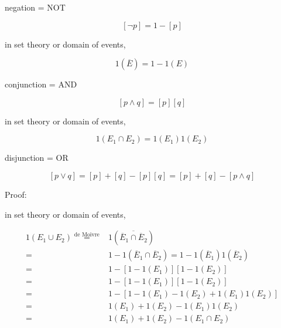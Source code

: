 \documentclass[
]{book}
\theoremstyle{definition}
\theoremstyle{definition}
\theoremstyle{definition}
\theoremstyle{definition}
\theoremstyle{remark}
\begin{document}
negation = NOT

\[
\left[\neg p\right]=1-\left[p\right]
\]

in set theory or domain of events,

\[
1\left(\overline{E}\right)=1-1\left(E\right)
\]

conjunction = AND

\[
\left[p\wedge q\right]=\left[p\right]\left[q\right]
\]

in set theory or domain of events,

\[
1\left(E_{{\scriptscriptstyle 1}}\cap E_{{\scriptscriptstyle 2}}\right)=1\left(E_{{\scriptscriptstyle 1}}\right)1\left(E_{{\scriptscriptstyle 2}}\right)
\]

disjunction = OR

\[
\left[p\vee q\right]=\left[p\right]+\left[q\right]-\left[p\right]\left[q\right]=\left[p\right]+\left[q\right]-\left[p\wedge q\right]
\]

Proof:

in set theory or domain of events,

\[
\begin{aligned}
1\left(E_{{\scriptscriptstyle 1}}\cup E_{{\scriptscriptstyle 2}}\right)\overset{\text{de Moivre}}{=} & 1\left(\overline{\overline{E}_{{\scriptscriptstyle 1}}\cap\overline{E}_{{\scriptscriptstyle 2}}}\right)\\
= & 1-1\left(\overline{E}_{{\scriptscriptstyle 1}}\cap\overline{E}_{{\scriptscriptstyle 2}}\right)=1-1\left(\overline{E}_{{\scriptscriptstyle 1}}\right)1\left(\overline{E}_{{\scriptscriptstyle 2}}\right)\\
= & 1-\left[1-1\left(E_{{\scriptscriptstyle 1}}\right)\right]\left[1-1\left(E_{{\scriptscriptstyle 2}}\right)\right]\\
= & 1-\left[1-1\left(E_{{\scriptscriptstyle 1}}\right)\right]\left[1-1\left(E_{{\scriptscriptstyle 2}}\right)\right]\\
= & 1-\left[1-1\left(E_{{\scriptscriptstyle 1}}\right)-1\left(E_{{\scriptscriptstyle 2}}\right)+1\left(E_{{\scriptscriptstyle 1}}\right)1\left(E_{{\scriptscriptstyle 2}}\right)\right]\\
= & 1\left(E_{{\scriptscriptstyle 1}}\right)+1\left(E_{{\scriptscriptstyle 2}}\right)-1\left(E_{{\scriptscriptstyle 1}}\right)1\left(E_{{\scriptscriptstyle 2}}\right)\\
= & 1\left(E_{{\scriptscriptstyle 1}}\right)+1\left(E_{{\scriptscriptstyle 2}}\right)-1\left(E_{{\scriptscriptstyle 1}}\cap E_{{\scriptscriptstyle 2}}\right)
\end{aligned}
\]
\end{document}
